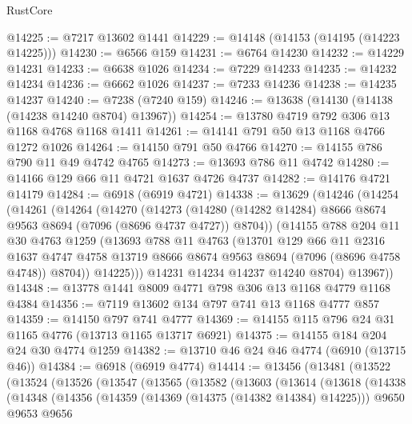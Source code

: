 \begin{lexlean}{RustCore}
\begin{coremodule}
@14225 := @7217 @13602 @1441
@14229 := @14148 (@14153 (@14195 (@14223 @14225)))
@14230 := @6566 @159
@14231 := @6764 @14230
@14232 := @14229 @14231
@14233 := @6638 @1026
@14234 := @7229 @14233
@14235 := @14232 @14234
@14236 := @6662 @1026
@14237 := @7233 @14236
@14238 := @14235 @14237
@14240 := @7238 (@7240 @159)
@14246 := @13638 (@14130 (@14138 (@14238 @14240 @8704) @13967))
@14254 := @13780 @4719 @792 @306 @13 @1168 @4768 @1168 @1411
@14261 := @14141 @791 @50 @13 @1168 @4766 @1272 @1026
@14264 := @14150 @791 @50 @4766
@14270 := @14155 @786 @790 @11 @49 @4742 @4765
@14273 := @13693 @786 @11 @4742
@14280 := @14166 @129 @66 @11 @4721 @1637 @4726 @4737
@14282 := @14176 @4721 @14179
@14284 := @6918 (@6919 @4721)
@14338 := @13629
    (@14246
      (@14254
        (@14261
          (@14264
            (@14270
              (@14273
                (@14280 (@14282 @14284) @8666 @8674 @9563 @8694 (@7096 (@8696 @4737 @4727)) @8704))
              (@14155
                @788
                @204
                @11
                @30
                @4763
                @1259
                (@13693
                  @788
                  @11
                  @4763
                  (@13701
                    @129
                    @66
                    @11
                    @2316
                    @1637
                    @4747
                    @4758
                    @13719
                    @8666
                    @8674
                    @9563
                    @8694
                    (@7096 (@8696 @4758 @4748))
                    @8704))
                @14225)))
          @14231
          @14234
          @14237
          @14240
          @8704)
        @13967))
@14348 := @13778 @1441 @8009 @4771 @798 @306 @13 @1168 @4779 @1168 @4384
@14356 := @7119 @13602 @134 @797 @741 @13 @1168 @4777 @857
@14359 := @14150 @797 @741 @4777
@14369 := @14155 @115 @796 @24 @31 @1165 @4776 (@13713 @1165 @13717 @6921)
@14375 := @14155 @184 @204 @24 @30 @4774 @1259
@14382 := @13710 @46 @24 @46 @4774 (@6910 (@13715 @46))
@14384 := @6918 (@6919 @4774)
@14414 := @13456
    (@13481
      (@13522
        (@13524
          (@13526
            (@13547
              (@13565
                (@13582
                  (@13603
                    (@13614
                      (@13618
                        (@14338
                          (@14348
                            (@14356
                              (@14359 (@14369 (@14375 (@14382 @14384) @14225)))
                              @9650
                              @9653
                              @9656

\end{coremodule}
\end{lexlean}
